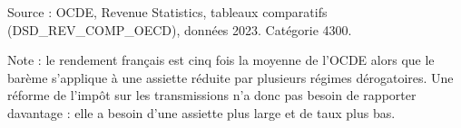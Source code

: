 Source : OCDE, Revenue Statistics, tableaux comparatifs (DSD\_REV\_COMP\_OECD), données 2023. Catégorie 4300.\par Note : le rendement français est cinq fois la moyenne de l'OCDE alors que le barème s'applique à une assiette réduite par plusieurs régimes dérogatoires. Une réforme de l'impôt sur les transmissions n'a donc pas besoin de rapporter davantage : elle a besoin d'une assiette plus large et de taux plus bas.
